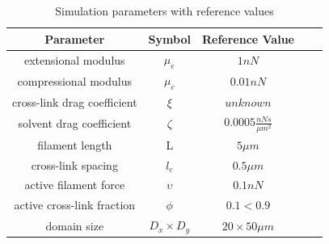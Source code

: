 \begin{table}[h]
	\centering
	\caption{Simulation parameters with reference values}
	\label{table:para}
	\begin{tabular}{|c|c|c|c|c|}
		\hline
		{\bf Parameter}             & {\bf Symbol} & {\bf Reference Value}          \\ \hline
		extensional modulus         & $\mu_e$        & $1 nN $                                               \\
		compressional modulus             & $\mu_c$     & $ 0.01 nN $                           \\
		cross-link drag coefficient & $\xi$      & $unknown $              \\
		solvent drag coefficient     & $\zeta$        & $0.0005 \frac{nN s}{\mu m^2} $      \\
		filament length             & L            & $5 \mu m$                                          \\
		cross-link spacing          & $l_c$        & $0.5 \mu m$                                         \\
		active filament force          & $\upsilon$        & $0.1 nN$                                         \\
		active cross-link fraction          & $\phi$        & $0.1<0.9$                                         \\
		domain size                 & $D_x\times D_y$            & $20\times 50 \mu m$                                 \\ \hline
	\end{tabular}
\end{table}